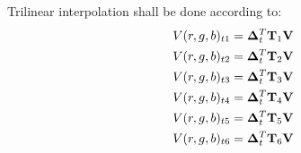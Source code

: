 Trilinear interpolation shall be done according to:
\begin{gather}
    V(r,g,b)_{t1} = \mathbf{\Delta}^T_t \mathbf{T}_1 \mathbf{V}\\
    V(r,g,b)_{t2} = \mathbf{\Delta}^T_t \mathbf{T}_2 \mathbf{V}\\
    V(r,g,b)_{t3} = \mathbf{\Delta}^T_t \mathbf{T}_3 \mathbf{V}\\
    V(r,g,b)_{t4} = \mathbf{\Delta}^T_t \mathbf{T}_4 \mathbf{V}\\
    V(r,g,b)_{t5} = \mathbf{\Delta}^T_t \mathbf{T}_5 \mathbf{V}\\
    V(r,g,b)_{t6} = \mathbf{\Delta}^T_t \mathbf{T}_6 \mathbf{V}
\end{gather} 

